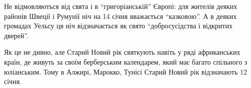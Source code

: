 Не відмовляються від свята і в \enquote{григоріанській} Європі: для жителів деяких
районів Швеції і Румунії ніч на 14 січня вважається \enquote{казковою}. А в деяких
громадах Уельсу ця ніч відзначається як свято \enquote{добросусідства і відкритих
дверей}.

Як це не дивно, але Старий Новий рік святкують навіть у ряді африканських
країн, де живуть за своїм берберським календарем, який має багато спільного з
юліанським. Тому в Алжирі, Марокко, Тунісі Старий Новий рік відзначають 12
січня.
